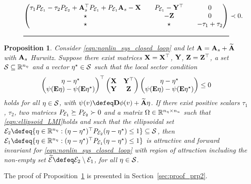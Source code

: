 \documentclass{ifacconf}
\newtheorem{proposition}{Proposition}
\begin{document}
\begin{figure*}
    \begin{equation}
    \label{eqn:ellipsoid_LMI}
    \left(\begin{matrix}\tau_1 P_{{\mathcal{E}}_1}- \tau_2 P_{{\mathcal{E}}_2} + {\bf{A}}_s^\top P_{{\mathcal{E}}_1} + P_{{\mathcal{E}}_1} {\bf{A}}_s - {\bf{X}} && P_{{\mathcal{E}}_1}  -{\bf{Y}}^\top && 0\\\star && - {\bf{Z}}&&0\\
    \star && \star  && -\tau_1 + \tau_2 \end{matrix}\right)\prec 0.
\end{equation}
    \vspace{.5em}
\hrule
\end{figure*}
\begin{proposition}\label{prp:invariant_set}
    Consider \eqref{eqn:nonlin_sys_closed_loop} and let ${\bf{A}} = {\bf{A}}_s +\widetilde {{\bf{A}}}$ with ${\bf{A}}_s$ Hurwitz. Suppose there exist matrices ${\bf{X}}={\bf{X}}^\top$, ${\bf{Y}}$, ${\bf{Z}}={\bf{Z}}^\top$, a set ${\mathcal{S}}\subseteq{\mathbb{R}}^{n_\eta}$ and a vector $\eta^\star\in{\mathcal{S}}$ such that the local sector condition
    \begin{equation}
        \label{eqn:local_sect_eta_reshaped}
        \left(\begin{matrix}\eta - \eta^\star\\ \psi({\bf{E}}\eta)-\psi({\bf{E}}\eta^\star)\end{matrix}\right)^\top\left(\begin{matrix}{\bf{X}} &{\bf{Y}}^\top\\{\bf{Y}}&{\bf{Z}}\end{matrix}\right)\left(\begin{matrix}\eta - \eta^\star\\ \psi({\bf{E}}\eta)-\psi({\bf{E}}\eta^\star)\end{matrix}\right)\le 0
    \end{equation}
    holds for all $\eta\in{\mathcal{S}}$, with $\psi(v)\defeq \bD \phi(v)+\widetilde \bA\eta$. 
    If there exist positive scalars $\tau_1$, $\tau_2$, two matrices $P_{{\mathcal{E}}_1}\succeq P_{{\mathcal{E}}_2}\succ 0$ and a matrix $\Omega\in{\mathbb{R}}^{n_\eta \times n_u}$ such that \eqref{eqn:ellipsoid_LMI}\footnotemark[2] holds and such that the ellipsoidal set $\cE_2\defeq\{\eta\in\RR^{n_\eta}:(\eta-\eta^\star)^\top P_{\cE_2} (\eta-\eta^\star) \le 1\} \subseteq\cS$, then $\cE_1\defeq\{\eta\in\RR^{n_\eta}:(\eta-\eta^\star)^\top P_{\cE_1} (\eta-\eta^\star) \le 1\}$ is  attractive and forward invariant for \eqref{eqn:nonlin_sys_closed_loop} with region of attraction including the  non-empty set $\widetilde\cE\defeq \cE_2\setminus\cE_1$, for all $\eta\in {\mathcal{S}}$.
\end{proposition}
The proof of Proposition~\ref{prp:invariant_set} is presented in Section~\ref{sec:proof_prp2}. 
\end{document}
